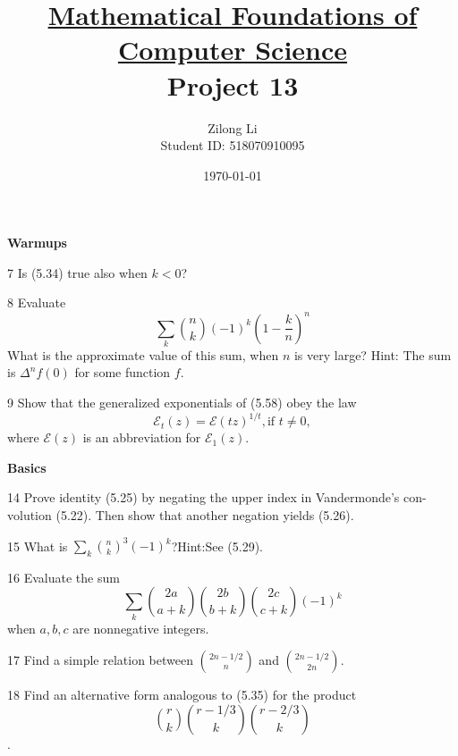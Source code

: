 \documentclass[a4paper,12pt]{article}
\title{\small \underline{Mathematical Foundations of Computer Science}\\\Large Project 13}
\author{Zilong Li\\\small Student ID: 518070910095}
\date{\today}
\theoremstyle{definition}
\newenvironment{problems}{\begin{list}{}{\renewcommand{\makelabel}[1]{\textbf{##1}\hfil}}}{\end{list}}
\begin{document}
\maketitle

\noindent\textbf{Warmups}

\begin{problems}
   \item[7]Is (5.34) true also when $k < 0$?
   \item[8]Evaluate 
   \begin{equation*}
       \sum_k\binom{n}{k}(-1)^k(1-\frac{k}{n})^n
   \end{equation*}
   What is the approximate value of this sum, when $n$ is very large? Hint: The sum is $\Delta^n f(0)$ for some function $f$.
   \item[9] Show that the generalized exponentials of (5.58) obey the law
   \begin{equation*}
        \mathcal{E}_t(z) =\mathcal{E}(tz)^{1/t},\text{if }t\neq 0,
   \end{equation*}
    where $\mathcal{E}(z)$ is an abbreviation for $\mathcal{E}_1(z)$.
\end{problems}

\noindent\textbf{Basics}

\begin{problems}
   \item[14]Prove identity (5.25) by negating the upper index in Vandermonde's con-volution (5.22).  Then show that another negation yields (5.26).
   \item[15]What is $\sum_k\binom{n}{k}^3(-1)^k$?Hint:See (5.29).
   \item[16]Evaluate the sum
   \begin{equation*}
       \sum_k\binom{2a}{a+k}\binom{2b}{b+k}\binom{2c}{c+k}(-1)^k
   \end{equation*}
   when $a, b, c$ are nonnegative integers.
   \item[17]Find a simple relation between $\binom{2n-1/2}{n}$ and $\binom{2n-1/2}{2n}$.
   \item[18]Find an alternative form analogous to (5.35) for the product
   \begin{equation*}
       \binom{r}{k}\binom{r-1/3}{k}\binom{r-2/3}{k}
   \end{equation*}.
\end{problems}
\end{document}
